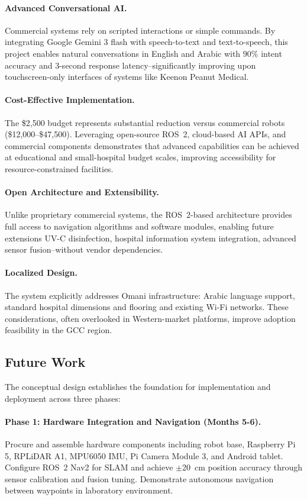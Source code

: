 \paragraph{Advanced Conversational AI.} Commercial systems rely on scripted interactions or simple commands. By integrating Google Gemini 3 flash with speech-to-text and text-to-speech, this project enables natural conversations in English and Arabic with 90\% intent accuracy and 3-second response latency--significantly improving upon touchscreen-only interfaces of systems like Keenon Peanut Medical.

\paragraph{Cost-Effective Implementation.} The \$2,500 budget represents substantial reduction versus commercial robots (\$12,000--\$47,500). Leveraging open-source ROS~2, cloud-based AI APIs, and commercial components demonstrates that advanced capabilities can be achieved at educational and small-hospital budget scales, improving accessibility for resource-constrained facilities.

\paragraph{Open Architecture and Extensibility.} Unlike proprietary commercial systems, the ROS~2-based architecture provides full access to navigation algorithms and software modules, enabling future extensions UV-C disinfection, hospital information system integration, advanced sensor fusion--without vendor dependencies.

\paragraph{Localized Design.} The system explicitly addresses Omani infrastructure: Arabic language support, standard hospital dimensions and flooring and existing Wi-Fi networks. These considerations, often overlooked in Western-market platforms, improve adoption feasibility in the GCC region.

\subsection{Future Work}

The conceptual design establishes the foundation for implementation and deployment across three phases:

\paragraph{Phase 1: Hardware Integration and Navigation (Months 5-6).} Procure and assemble hardware components including robot base, Raspberry Pi 5, RPLiDAR A1, MPU6050 IMU, Pi Camera Module 3, and Android tablet. Configure ROS~2 Nav2 for SLAM and achieve $\pm$20~cm position accuracy through sensor calibration and fusion tuning. Demonstrate autonomous navigation between waypoints in laboratory environment.

